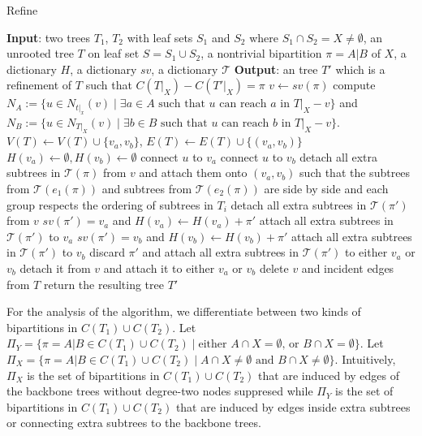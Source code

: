\documentclass{bmcart}
\begin{document}
\begin{algorithm}
    \caption{Refine}
    \label{alg:refine}
    \begin{algorithmic}[1]
        \Statex \textbf{Input}: two trees $T_1$, $T_2$ with leaf sets $S_1$ and $S_2$ where $S_1 \cap S_2 = X \neq \emptyset$, an unrooted tree $T$ on leaf set $S = S_1 \cup S_2$, a nontrivial bipartition $\pi = A|B$ of $X$, a dictionary $H$, a dictionary $sv$, a dictionary $\mathcal{T}$
        \Statex \textbf{Output}: an tree $T'$ which is a refinement of $T$ such that $C(T|_X) - C(T'|_X) = \pi$ 
        \State $v \gets sv(\pi)$
        \State compute $N_A:= \{u \in N_{t|_x}(v) \mid \text{$\exists a \in A$ such that $u$ can reach $a$ in $T|_X-v$}\}$ and $N_B:= \{u \in N_{T|_X}(v) \mid \text{$\exists b \in B$ such that $u$ can reach $b$ in $T|_X-v$}\}$.
        \State $V(T) \gets V(T) \cup \{v_a, v_b\}$, $E(T) \gets E(T) \cup \{(v_a,v_b)\}$
        \State $H(v_a) \gets \emptyset, H(v_b) \gets \emptyset$
             connect $u$ to $v_a$
            \Else{} connect $u$ to $v_b$
            \EndIf
        \EndFor
        \State detach all extra subtrees in $\mathcal{T}(\pi)$ from $v$ and attach them onto $(v_a,v_b)$ such that the subtrees from $\mathcal{T}(e_1(\pi))$ and subtrees from $\mathcal{T}(e_2(\pi))$ are side by side and each group respects the ordering of subtrees in $T_i$
            \State detach all extra subtrees in $\mathcal{T}(\pi')$ from $v$ 
                \State $sv(\pi') = v_a$ and $H(v_a) \gets H(v_a) + \pi'$
                \State attach all extra subtrees in $\mathcal{T}(\pi')$ to $v_a$
                \State $sv(\pi') = v_b$ and $H(v_b) \gets H(v_b) + \pi'$
                \State attach all extra subtrees in $\mathcal{T}(\pi')$ to $v_b$
            \Else{} 
                \State discard $\pi'$ and attach all extra subtrees in $\mathcal{T}(\pi')$ to either $v_a$ or $v_b$ 
            \EndIf
        \EndFor
            \State detach it from $v$ and attach it to either $v_a$ or $v_b$
        \EndFor
        \State delete $v$ and incident edges from $T$
        \State return the resulting tree $T'$
    \end{algorithmic}
\end{algorithm}

For the analysis of the algorithm, we differentiate between two kinds of bipartitions in $C(T_1) \cup C(T_2)$. Let $\Pi_Y = \{\pi = A|B \in C(T_1) \cup C(T_2) \mid \text{either } A\cap X = \emptyset \text{, or } B \cap X = \emptyset\}$. Let $\Pi_X = \{\pi = A|B \in C(T_1) \cup C(T_2) \mid A\cap X \neq \emptyset \text{ and } B\cap X \neq \emptyset \}$. Intuitively, $\Pi_X$ is the set of bipartitions in $C(T_1)\cup C(T_2)$ that are induced by edges of the backbone trees without degree-two nodes suppresed while $\Pi_Y$ is the set of bipartitions in $C(T_1)\cup C(T_2)$ that are induced by edges inside extra subtrees or connecting extra subtrees to the backbone trees.\smallskip
\end{document}
